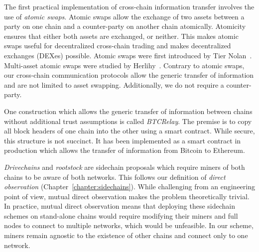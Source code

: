 The first practical implementation of cross-chain information transfer involves
the use of \emph{atomic swaps}. Atomic swaps allow the exchange of two assets
between a party on one chain and a counter-party on another chain atomically.
Atomicity ensures that either both assets are exchanged, or neither. This makes
atomic swaps useful for decentralized cross-chain trading and makes
decentralized exchanges (DEXes) possible. Atomic swaps were first introduced by
Tier Nolan~\cite{tiernolan}. Multi-asset atomic swaps were studied
by Herlihy~\cite{herlihy2018atomic}. Contrary to atomic swaps, our cross-chain
communication protocols allow the generic transfer of information and are not
limited to asset swapping. Additionally, we do not require a counter-party.

One construction which allows the generic transfer of information between chains
without additional trust assumptions is called \emph{BTCRelay}. The premise is
to copy all block headers of one chain into the other using a smart contract.
While secure, this structure is not succinct. It has been implemented as a smart
contract in production which allows the transfer of information from Bitcoin to
Ethereum.

\emph{Drivechains} and \emph{rootstock} are sidechain proposals which require
miners of both chains to be aware of both networks. This follows our definition
of \emph{direct observation} (Chapter~\ref{chapter:sidechains}). While
challenging from an engineering point of view, mutual direct observation makes
the problem theoretically trivial. In practice, mutual direct observation means
that deploying these sidechain schemes on stand-alone chains would require
modifying their miners and full nodes to connect to multiple networks, which
would be unfeasible. In our scheme, miners remain agnostic to the
existence of other chains and connect only to one network.

